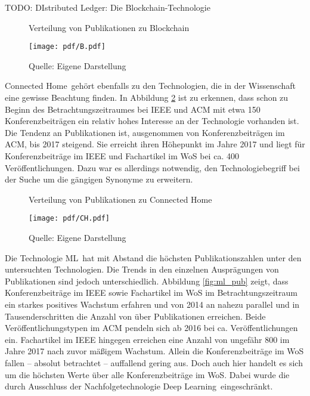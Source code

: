 TODO: DIstributed Ledger: Die \glqq Blockchain-Technologie\grqq~

\begin{figure}
	\centering
	\caption{Verteilung von Publikationen zu \glqq Blockchain\grqq}
	\texttt{[image: pdf/B.pdf]}
	\caption*{Quelle: Eigene Darstellung}
	\label{fig:b_pub}
\end{figure}

\glqq Connected Home\grqq~gehört ebenfalls zu den Technologien, die in der Wissenschaft eine gewisse Beachtung finden. In Abbildung \ref{fig:ch_pub} ist zu erkennen, dass schon zu Beginn des Betrachtungszeitraumes bei \ac{IEEE} und \ac{ACM} mit etwa 150 Konferenzbeiträgen ein relativ hohes Interesse an der Technologie vorhanden ist. Die Tendenz an Publikationen ist, ausgenommen von Konferenzbeiträgen im \ac{ACM}, bis 2017 steigend. Sie erreicht ihren Höhepunkt im Jahre 2017 und liegt für Konferenzbeiträge im \ac{IEEE} und Fachartikel im \ac{WoS} bei ca. 400 Veröffentlichungen. Dazu war es allerdings notwendig, den Technologiebegriff bei der Suche um die gängigen Synonyme zu erweitern.

\begin{figure}
	\centering
	\caption{Verteilung von Publikationen zu \glqq Connected Home\grqq}
	\texttt{[image: pdf/CH.pdf]}
	\caption*{Quelle: Eigene Darstellung}
	\label{fig:ch_pub}
\end{figure}

Die Technologie \glqq \acl{ML}\grqq~hat mit Abstand die höchsten Publikationszahlen unter den untersuchten Technologien. Die Trends in den einzelnen Ausprägungen von Publikationen sind jedoch unterschiedlich. Abbildung \ref{fig:ml_pub} zeigt, dass Konferenzbeiträge im \ac{IEEE} sowie Fachartikel im \ac{WoS} im Betrachtungszeitraum ein starkes positives Wachstum erfahren und von 2014 an nahezu parallel und in Tausenderschritten die Anzahl von über  Publikationen erreichen. Beide Veröffentlichungstypen im \ac{ACM} pendeln sich ab 2016 bei ca.  Veröffentlichungen ein. Fachartikel im \ac{IEEE} hingegen erreichen eine Anzahl von ungefähr 800 im Jahre 2017 nach zuvor mäßigem Wachstum. Allein die Konferenzbeiträge im \ac{WoS} fallen -- absolut betrachtet -- auffallend gering aus. Doch auch hier handelt es sich um die höchsten Werte über alle Konferenzbeiträge im \ac{WoS}. Dabei wurde die durch Ausschluss der Nachfolgetechnologie \glqq Deep Learning\grqq~eingeschränkt.

